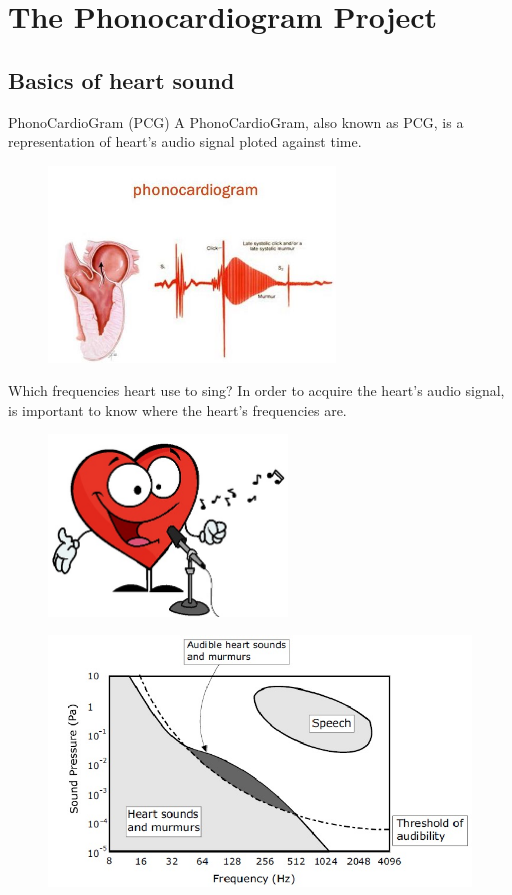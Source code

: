 \documentclass[newPxFont]{beamer}
\begin{document}
\section{The Phonocardiogram Project}
\subsection{Basics of heart sound}
\begin{frame}{PhonoCardioGram (PCG)}
A PhonoCardioGram, also known as PCG, is a representation of
heart's audio signal ploted against time.

\begin{figure}
  \centering
  \includegraphics[width=3in]{pcg}
\end{figure}
\end{frame}
\begin{frame}{Which frequencies heart use to sing?}
In order to acquire the heart's audio signal, is important to know where
the heart's frequencies are.

\begin{figure}
  \centering
  \includegraphics[width=2.5in]{singing}
\end{figure}
\end{frame}
\begin{frame}
\begin{figure}
  \includegraphics[width=4.5in]{heartFreq}
\end{figure}
\end{frame}
\end{document}

